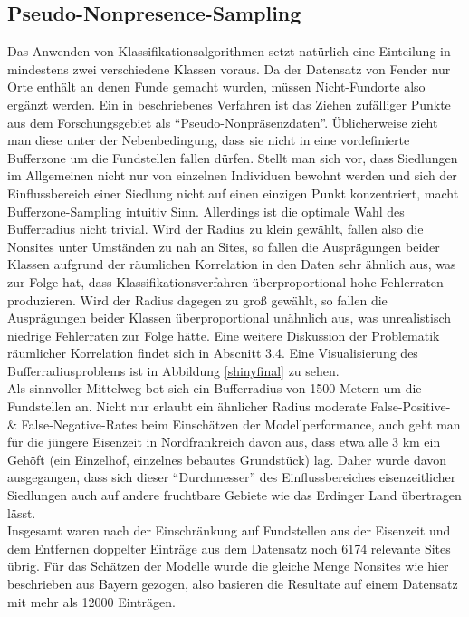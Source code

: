 \subsection{Pseudo-Nonpresence-Sampling}

Das Anwenden von Klassifikationsalgorithmen setzt natürlich eine Einteilung in mindestens zwei verschiedene Klassen voraus. Da der Datensatz von Fender nur Orte enthält an denen Funde gemacht wurden, müssen Nicht-Fundorte also ergänzt werden. Ein in \cite{lovelace2019} beschriebenes Verfahren ist das Ziehen zufälliger Punkte aus dem Forschungsgebiet als ``Pseudo-Nonpräsenzdaten''. Üblicherweise zieht man diese unter der Nebenbedingung, dass sie nicht in eine vordefinierte Bufferzone um die Fundstellen fallen dürfen. Stellt man sich vor, dass Siedlungen im Allgemeinen nicht nur von einzelnen Individuen bewohnt werden und sich der Einflussbereich einer Siedlung nicht auf einen einzigen Punkt konzentriert, macht Bufferzone-Sampling intuitiv Sinn. Allerdings ist die optimale Wahl des Bufferradius nicht trivial. Wird der Radius zu klein gewählt, fallen also die Nonsites unter Umständen zu nah an Sites, so fallen die Ausprägungen beider Klassen aufgrund der räumlichen Korrelation in den Daten sehr ähnlich aus, was zur Folge hat, dass Klassifikationsverfahren überproportional hohe Fehlerraten produzieren. Wird der Radius dagegen zu groß gewählt, so fallen die Ausprägungen beider Klassen überproportional unähnlich aus, was unrealistisch niedrige Fehlerraten zur Folge hätte. Eine weitere Diskussion der Problematik räumlicher Korrelation findet sich in Abscnitt 3.4. Eine Visualisierung des Bufferradiusproblems ist in Abbildung \ref{shinyfinal} zu sehen. \\
Als sinnvoller Mittelweg bot sich ein Bufferradius von 1500 Metern um die Fundstellen an. Nicht nur erlaubt ein ähnlicher Radius moderate False-Positive- \& False-Negative-Rates beim Einschätzen der Modellperformance, auch geht man für die jüngere Eisenzeit in Nordfrankreich davon aus, dass etwa alle 3 km ein Gehöft (ein Einzelhof, einzelnes bebautes Grundstück) lag. \cite{nordfrankreich} Daher wurde davon ausgegangen, dass sich dieser ``Durchmesser'' des Einflussbereiches eisenzeitlicher Siedlungen auch auf andere fruchtbare Gebiete wie das Erdinger Land übertragen lässt. \\
Insgesamt waren nach der Einschränkung auf Fundstellen aus der Eisenzeit und dem Entfernen doppelter Einträge aus dem Datensatz noch 6174 relevante Sites übrig. Für das Schätzen der Modelle wurde die gleiche Menge Nonsites wie hier beschrieben aus Bayern gezogen, also basieren die Resultate auf einem Datensatz mit mehr als 12000 Einträgen. 

